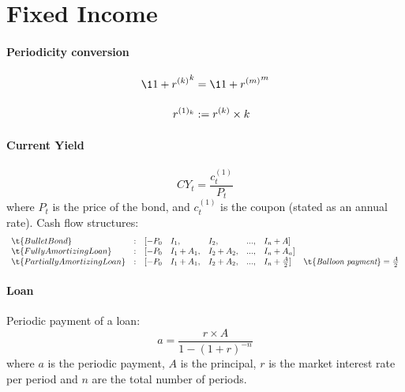 \documentclass[12pt,article]{memoir}
\begin{document}

\chapter{Fixed Income}

\subsubsection{Periodicity conversion}
\begin{align*}
\1{1+r^{(k)}}^k &= \1{1+r^{(m)}}^m 
\\[1em]
r^{(1)_k} &:= r^{(k)}\times k
\end{align*}

\subsubsection{Current Yield}
$$CY_t = \frac{c^{(1)}_t}{P_t}$$
where $P_t$ is the price of the bond, and $c^{(1)}_t$ is the coupon (stated as an annual rate).
Cash flow structures: 
$$\begin{array}{llllllll}
\t{Bullet Bond} & : & [-P_0 & I_1, & I_2, &..., &I_n + A]
\\ 
\t{Fully Amortizing Loan} &:& [-P_0 & I_1+A_1, &I_2+A_2, &..., & I_n+A_n]
\\
\t{Partially Amortizing Loan} &:& [-P_0 & I_1+A_1, &I_2+A_2, &..., & I_n+\frac{A}{2}] & \t{\textit{Balloon payment}}=\frac{A}{2}
\end{array}$$
\subsubsection{Loan}
Periodic payment of a loan: 
$$
a = \frac{r \times A}{1-(1+r)^{-n}}
$$
where $a$ is the periodic payment, $A$ is the principal, $r$ is the market interest rate per period and $n$ are the total number of periods.


\end{document}
